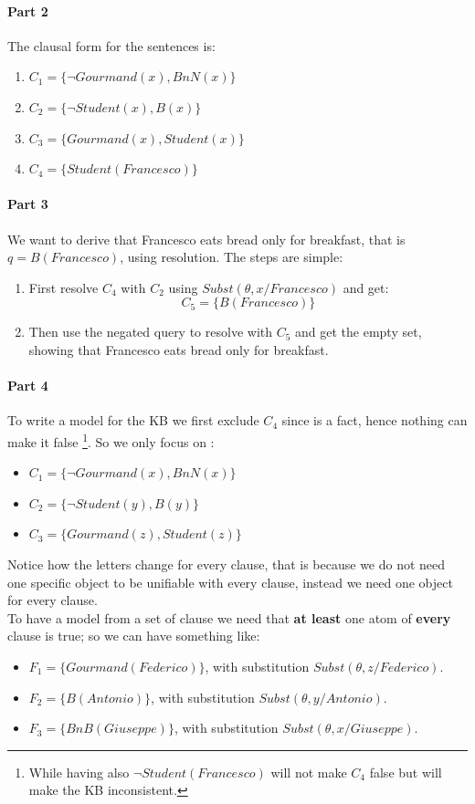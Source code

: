 \documentclass[10pt,a4paper]{article}
\newcommand{\braces}[1]{%
  \lbrace{#1}\rbrace}
\newcommand{\subst}[1]{Subst(\theta,#1)}
\begin{document}
\begin{enumerate}
\paragraph{Part 2}
The clausal form for the sentences is:

\begin{enumerate}
\item $C_1=\braces{\neg Gourmand(x), BnN(x)}$
\item $C_2=\braces{\neg Student(x), B(x)}$
\item $C_3=\braces{Gourmand(x), Student(x)}$
\item $C_4=\braces{Student(Francesco)}$
\end{enumerate}

\paragraph{Part 3}

We want to derive that Francesco eats bread only for breakfast, that is $q=B(Francesco)$, using resolution. The steps are simple:

\begin{enumerate}
\item First resolve $C_4$ with $C_2$ using $\subst{x/Francesco}$ and get:
\[C_5=\braces{B(Francesco)}\]
\item Then use the negated query to resolve with $C_5$ and get the empty set, showing that Francesco eats bread only for breakfast.
\end{enumerate}

\paragraph{Part 4}
To write a model for the KB we first exclude $C_4$ since is a fact, hence nothing can make it false \footnote{While having also $\neg Student(Francesco)$ will not make $C_4$ false but will make the KB inconsistent.}. So we only focus on :
\begin{itemize}
\item $C_1=\braces{\neg Gourmand(x), BnN(x)}$
\item $C_2=\braces{\neg Student(y), B(y)}$
\item $C_3=\braces{Gourmand(z), Student(z)}$
\end{itemize}
Notice how the letters change for every clause, that is because we do not need one specific object to be unifiable with every clause, instead we need one object for every clause.\\
To have a model from a set of clause we need that \textbf{at least} one atom of \textbf{every} clause is true; so we can have something like:
\begin{itemize}
\item $F_1=\braces{Gourmand(Federico)}$, with substitution $\subst{z/Federico}$.
\item $F_2=\braces{B(Antonio)}$, with substitution $\subst{y/Antonio}$.
\item $F_3=\braces{BnB(Giuseppe)}$, with substitution $\subst{x/Giuseppe}$.
\end{itemize}






\end{enumerate}
\end{document}
